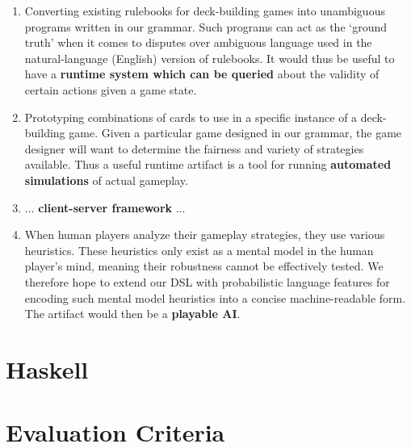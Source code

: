 \documentclass{acm_proc_article-sp}
\begin{document}
\begin{enumerate}
\item Converting existing rulebooks for deck-building games into unambiguous programs written in
our grammar. Such programs can act as the `ground truth' when it comes to disputes over ambiguous
language used in the natural-language (English) version of rulebooks. It would thus be useful to
have a {\bf runtime system which can be queried} about the validity of certain actions given a game state.

\item Prototyping combinations of cards to use in a specific instance of a deck-building game.
Given a particular game designed in our grammar, the game designer will want to determine the
fairness and variety of strategies available. Thus a useful runtime artifact is a tool for
running {\bf automated simulations} of actual gameplay.

\item ... {\bf client-server framework} ...

\item When human players analyze their gameplay strategies, they use various heuristics.
These heuristics only exist as a mental model in the human player's mind, meaning their
robustness cannot be effectively tested. We therefore hope to extend our DSL with probabilistic
language features for encoding such mental model heuristics into a concise machine-readable form.
The artifact would then be a {\bf playable AI}.

\end{enumerate}

\section{Haskell}
\label{sec:haskell}

\section{Evaluation Criteria}
\label{sec:evaluation}

\begin{biblist}
\end{biblist}

\end{document}
